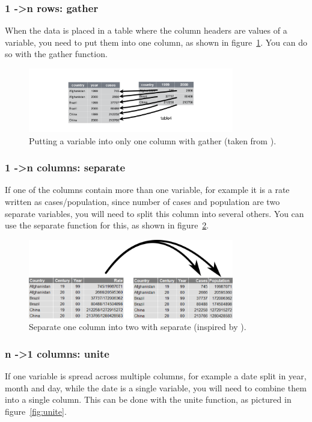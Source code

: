 \documentclass{report}
\newcommand{\code}[1]{\textsf{\ttfamily #1}}
\begin{document}
		\subsubsection{1 -\textgreater n rows: \code{gather}}
		When the data is placed in a table where the column headers are values of a variable, you need to put them into one column, as shown in figure~\ref{fig:gather}. You can do so with the \code{gather} function.
		
		\begin{figure}[h]
			\centering
			\includegraphics[width=0.8\textwidth]{gather.png}
			\caption{Putting a variable into only one column with \code{gather} (taken from \cite{tidy}).}
			\label{fig:gather}
		\end{figure}
		
		\subsubsection{1 -\textgreater n columns: \code{separate}}
		If one of the columns contain more than one variable, for example it is a rate written as cases/population, since number of cases and population are two separate variables, you will need to split this column into several others. You can use the \code{separate} function for this, as shown in figure~\ref{fig:separate}.
		
		\begin{figure}[h]
			\centering
			\includegraphics[width=0.8\textwidth]{separate.png}
			\caption{Separate one column into two with \code{separate} (inspired by \cite{tidy}).}
			\label{fig:separate}
		\end{figure}
		
		\subsubsection{n -\textgreater 1 columns: \code{unite}}
		If one variable is spread across multiple columns, for example a date split in year, month and day, while the date is a single variable, you will need to combine them into a single column. This can be done with the \code{unite} function, as pictured in figure~\ref{fig:unite}.
		
\end{document}
